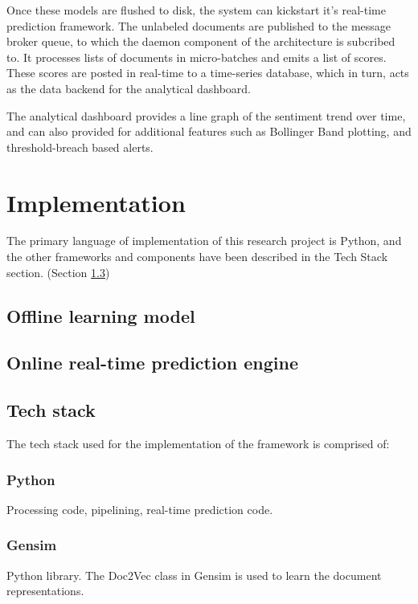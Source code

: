 \documentclass[conference]{IEEEtran}
\begin{document}
    Once these models are flushed to disk, the system can kickstart it's real-time prediction framework. 
    The unlabeled documents are published to the message broker queue, to which the daemon component of the architecture is subcribed to. 
    It processes lists of documents in micro-batches and emits a list of scores. 
    These scores are posted in real-time to a time-series database, which in turn, acts as the data backend for the analytical dashboard.

    The analytical dashboard provides a line graph of the sentiment trend over time, and can also provided for additional features such as Bollinger Band plotting, and threshold-breach based alerts.


\vspace{5mm}

\section{Implementation}

The primary language of implementation of this research project is Python, and the other frameworks and components have been described in the Tech Stack section. (Section \ref{Tech stack})

    \subsection{Offline learning model}


    \subsection{Online real-time prediction engine}


    \subsection{Tech stack} \label{Tech stack}
    The tech stack used for the implementation of the framework is comprised of:

        \subsubsection{Python}
        Processing code, pipelining, real-time prediction code\cite{python}.

        \subsubsection{Gensim}
        Python library. The Doc2Vec class in Gensim is used to learn the document representations\cite{doc2vec_api}.
        
\end{document}
